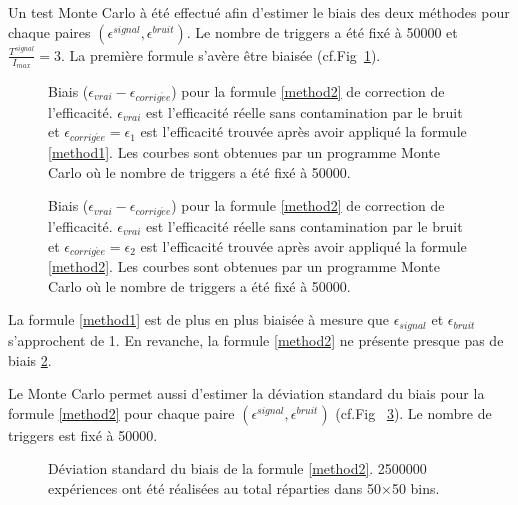 Un test Monte Carlo à été effectué afin d'estimer le biais des deux méthodes pour chaque paires $\left(\epsilon^{signal},\epsilon^{bruit}\right)$. Le nombre de triggers a été fixé à \num{50000} et $\frac{T^{signal}}{I_{max}}=3$. La première formule s'avère être biaisée (cf.Fig~\ref{biaismethod1}).

\tikzexternaldisable
\begin{figure}[!ht]
\centering
{}
\caption{Biais ($\epsilon_{vrai} -\epsilon_{corrig\acute ee}$) pour la formule \ref{method2} de correction de l'efficacité. $\epsilon_{vrai}$ est l'efficacité réelle sans contamination par le bruit et $\epsilon_{corrig\acute ee}=\epsilon_{1}$ est l'efficacité trouvée après avoir appliqué la formule \ref{method1}. Les courbes sont obtenues par un programme Monte Carlo où le nombre de triggers a été fixé à \num{50000}.}
\label{biaismethod1}
\end{figure}

\begin{figure}[!ht]
	\centering
	\caption{Biais ($\epsilon_{vrai} -\epsilon_{corrig\acute ee}$) pour la formule \ref{method2} de correction de l'efficacité. $\epsilon_{vrai}$ est l'efficacité réelle sans contamination par le bruit et $\epsilon_{corrig\acute ee}=\epsilon_{2}$ est l'efficacité trouvée après avoir appliqué la formule \ref{method2}. Les courbes sont obtenues par un programme Monte Carlo où le nombre de triggers a été fixé à \num{50000}.}
	\label{biaismethod2}
\end{figure}


La formule \ref{method1} est de plus en plus biaisée à mesure que $\epsilon_{signal}$ et $\epsilon_{bruit}$ s'approchent de \num {1}. En revanche, la formule \ref{method2} ne présente presque pas de biais \ref{biaismethod2}.

\newpage
Le Monte Carlo permet aussi d'estimer la déviation standard du biais pour la formule \ref{method2} pour chaque paire $\left(\epsilon^{signal},\epsilon^{bruit}\right)$ (cf.Fig~ \ref{RMSmethod2}). Le nombre de triggers est fixé à \num{50000}.

\begin{figure}[!ht]
	\centering
	\caption{Déviation standard du biais de la formule \ref{method2}. \num{2500000} expériences ont été réalisées au total réparties dans \num{50}$\times$\num{50} bins.}
	\label{RMSmethod2}
\end{figure}
\tikzexternalenable

